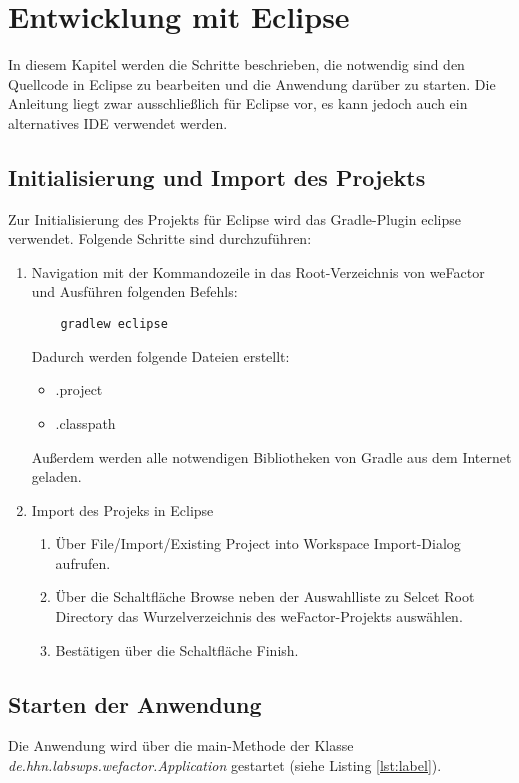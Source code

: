 
\thispagestyle{plain}

\chapter{Entwicklung mit Eclipse}\label{c_eclipse}
In diesem Kapitel werden die Schritte beschrieben, die notwendig sind den Quellcode in Eclipse zu bearbeiten und die Anwendung darüber zu starten. Die Anleitung liegt zwar ausschließlich für Eclipse vor, es kann jedoch auch ein alternatives \ac{IDE} verwendet werden.
\section{Initialisierung und Import des Projekts}\label{s_initEclipse}
Zur Initialisierung des Projekts für Eclipse wird das Gradle-Plugin eclipse verwendet. Folgende Schritte sind durchzuführen:
   \begin{enumerate}

    \item Navigation mit der Kommandozeile in das Root-Verzeichnis von weFactor und Ausführen folgenden Befehls:
    \begin{lstlisting}
    gradlew eclipse
    \end{lstlisting}
    Dadurch werden folgende Dateien erstellt:
    \begin{itemize}
	    \item .project
	    \item .classpath
    \end{itemize}
    Außerdem werden alle notwendigen Bibliotheken von Gradle aus dem Internet geladen.
    \item Import des Projeks in Eclipse
       \begin{enumerate}
       	\item Über File/Import/Existing Project into Workspace Import-Dialog aufrufen.
       	\item Über die Schaltfläche Browse neben der Auswahlliste zu Selcet Root Directory das Wurzelverzeichnis des weFactor-Projekts auswählen.
       	\item Bestätigen über die Schaltfläche Finish.
       \end{enumerate}

   \end{enumerate}
   \section{Starten der Anwendung}\label{s_startFromEclipse}
   Die Anwendung wird über die main-Methode der Klasse \emph{de.hhn.labswps.wefactor.Application} gestartet (siehe Listing \ref{lst:label}).

